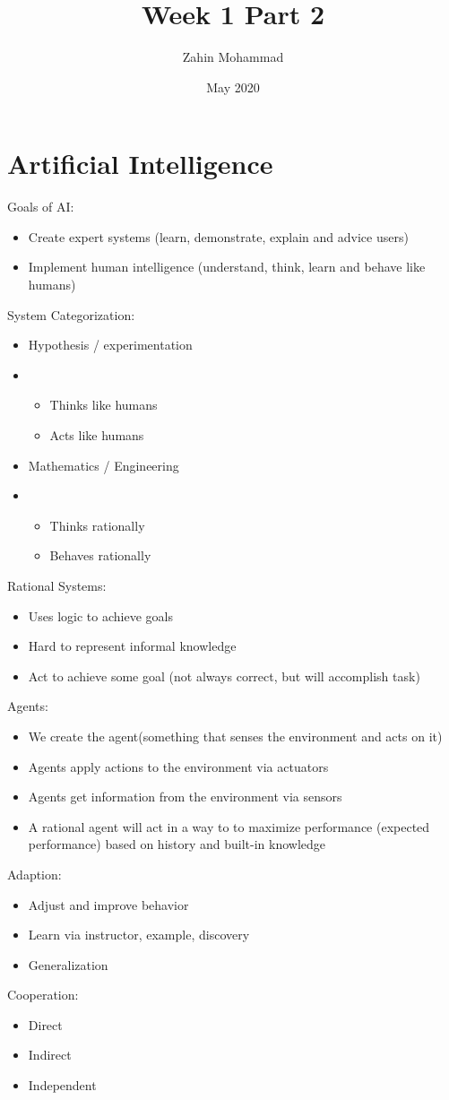 \documentclass{article}
\title{Week 1 Part 2}
\author{Zahin Mohammad}
\date{May 2020}
\begin{document}
\maketitle
\section{Artificial Intelligence}
Goals of AI:
\begin{itemize}
    \item Create expert systems (learn, demonstrate, explain and advice users) 
    \item Implement human intelligence (understand, think, learn and behave like humans)
\end{itemize}

System Categorization:
\begin{itemize}
    \item Hypothesis / experimentation
    \item \begin{itemize}
        \item Thinks like humans
        \item Acts like humans
    \end{itemize}
    \item Mathematics / Engineering
    \item \begin{itemize}
        \item Thinks rationally
        \item Behaves rationally
    \end{itemize}
\end{itemize}

Rational Systems:
\begin{itemize}
    \item Uses logic to achieve goals
    \item Hard to represent informal knowledge
    \item Act to achieve some goal (not always correct, but will accomplish task)
\end{itemize}

Agents:
\begin{itemize}
    \item We create the agent(something that senses the environment and acts on it)
    \item Agents apply actions to the environment via actuators
    \item Agents get information from the environment via sensors
    \item A rational agent will act in a way to to maximize performance (expected performance) based on history and built-in knowledge
\end{itemize}

Adaption:
\begin{itemize}
    \item Adjust and improve behavior
    \item Learn via instructor, example, discovery
    \item Generalization
\end{itemize}

Cooperation:
\begin{itemize}
    \item Direct 
    \item Indirect
    \item Independent
\end{itemize}

\printbibliography[title={Referências}]
\end{document}
